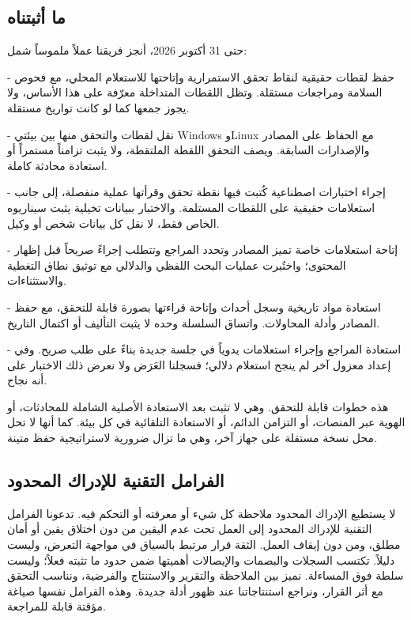 \documentclass[11pt]{article}
\begin{document}
\begin{RTL}
\subsection*{ما أثبتناه}

حتى 31 أكتوبر 2026، أنجز فريقنا عملاً ملموساً شمل:

- حفظ لقطات حقيقية لنقاط تحقق الاستمرارية وإتاحتها للاستعلام المحلي، مع فحوص السلامة ومراجعات مستقلة. وتظل اللقطات المتداخلة معرّفة على هذا الأساس، ولا يجوز جمعها كما لو كانت تواريخ مستقلة.

- نقل لقطات والتحقق منها بين بيئتي Windows وLinux مع الحفاظ على المصادر والإصدارات السابقة. ويصف التحقق اللقطة الملتقطة، ولا يثبت تزامناً مستمراً أو استعادة محادثة كاملة.

- إجراء اختبارات اصطناعية كُتبت فيها نقطة تحقق وقرأتها عملية منفصلة، إلى جانب استعلامات حقيقية على اللقطات المستلمة. والاختبار ببيانات تخيلية يثبت سيناريوه الخاص فقط، لا نقل كل بيانات شخص أو وكيل.

- إتاحة استعلامات خاصة تميز المصادر وتحدد المراجع وتتطلب إجراءً صريحاً قبل إظهار المحتوى؛ واختُبرت عمليات البحث اللفظي والدلالي مع توثيق نطاق التغطية والاستثناءات.

- استعادة مواد تاريخية وسجل أحداث وإتاحة قراءتها بصورة قابلة للتحقق، مع حفظ المصادر وأدلة المحاولات. واتساق السلسلة وحده لا يثبت التأليف أو اكتمال التاريخ.

- استعادة المراجع وإجراء استعلامات يدوياً في جلسة جديدة بناءً على طلب صريح. وفي إعداد معزول آخر لم ينجح استعلام دلالي؛ فسجلنا العَرَض ولا نعرض ذلك الاختبار على أنه نجاح.

هذه خطوات قابلة للتحقق. وهي لا تثبت بعد الاستعادة الأصلية الشاملة للمحادثات، أو الهوية عبر المنصات، أو التزامن الدائم، أو الاستعادة التلقائية في كل بيئة. كما أنها لا تحل محل نسخة مستقلة على جهاز آخر، وهي ما تزال ضرورية لاستراتيجية حفظ متينة.

\subsection*{الفرامل التقنية للإدراك المحدود}

لا يستطيع الإدراك المحدود ملاحظة كل شيء أو معرفته أو التحكم فيه. تدعونا الفرامل التقنية للإدراك المحدود إلى العمل تحت عدم اليقين من دون اختلاق يقين أو أمان مطلق، ومن دون إيقاف العمل. الثقة قرار مرتبط بالسياق في مواجهة التعرض، وليست دليلاً. تكتسب السجلات والبصمات والإيصالات أهميتها ضمن حدود ما تثبته فعلاً؛ وليست سلطة فوق المساءلة. نميز بين الملاحظة والتقرير والاستنتاج والفرضية، ونناسب التحقق مع أثر القرار، ونراجع استنتاجاتنا عند ظهور أدلة جديدة. وهذه الفرامل نفسها صياغة مؤقتة قابلة للمراجعة.


\end{RTL}
\end{document}
